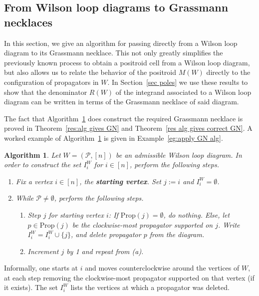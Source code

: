 \documentclass[11pt]{article}
\newcommand{\cP}{\mathcal{P}}
\newcommand{\Prop}{\textrm{Prop}}
\newtheorem{algorithm}[thm]{Algorithm}
\theoremstyle{remark}
\theoremstyle{definition}
\begin{document}
\subsection{From Wilson loop diagrams to Grassmann necklaces}\label{sec:GN alg}

In this section, we give an algorithm for passing directly from a Wilson loop diagram to its Grassmann necklace. This not only greatly simplifies the previously known process to obtain a positroid cell from a Wilson loop diagram, but also allows us to relate the behavior of the positroid $M(W)$ directly to the configuration of propagators in $W$. In Section~\ref{sec poles} we use these results to show that the denominator $R(W)$ of the integrand associated to a Wilson loop diagram can be written in terms of the Grassmann necklace of said diagram. 

The fact that Algorithm~\ref{alg:put GN on WLD} does construct the required Grassmann necklace is proved in Theorem~\ref{res:alg gives GN} and Theorem~\ref{res alg gives correct GN}. A worked example of Algorithm~\ref{alg:put GN on WLD} is given in Example~\ref{eg:apply GN alg}.

\begin{algorithm}\label{alg:put GN on WLD}
Let $W = (\cP, [n])$ be an admissible Wilson loop diagram. In order to construct the set $I_i^W$ for $i \in [n]$, perform the following steps.

\begin{enumerate}
\item Fix a vertex $i \in [n]$, the {\bf starting vertex}. Set $j:=i$ and $I_i^W = \emptyset$.
\item While $\cP \neq \emptyset$, perform the following steps.
\begin{enumerate}
\item {\em Step $j$ for starting vertex $i$}: If $\Prop(j) = \emptyset$, do nothing. Else, let $p \in \Prop(j)$ be the clockwise-most propagator supported on $j$. Write $I_i^W = I_i^W\cup \{j\}$, and delete propagator $p$ from the diagram.
\item Increment $j$ by 1 and repeat from (a).
\end{enumerate}
\end{enumerate}
\end{algorithm}

Informally, one starts at $i$ and moves counterclockwise around the vertices of $W$, at each step removing the clockwise-most propagator supported on that vertex (if it exists). The set $I_i^W$ lists the vertices at which a propagator was deleted. 
\end{document}
